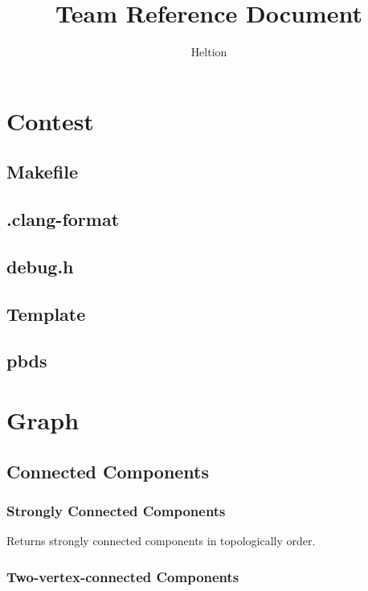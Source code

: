 \documentclass{article}
\begin{document}
\title{Team Reference Document}
\author{Heltion}
\maketitle
\newpage
\begin{multicols}{2}
    \tableofcontents
    \newpage
    \setcounter{page}{1}
    \footnotesize

    \section{Contest}
    \subsection{Makefile}
    
    \subsection{.clang-format}
    
    \subsection{debug.h}
    
    \subsection{Template}
    
    \subsection{pbds}
    

    \section{Graph}
    \subsection{Connected Components}
    \subsubsection{Strongly Connected Components}
    Returns strongly connected components in topologically order.
    

    \subsubsection{Two-vertex-connected Components}
    


\end{multicols}
\end{document}
